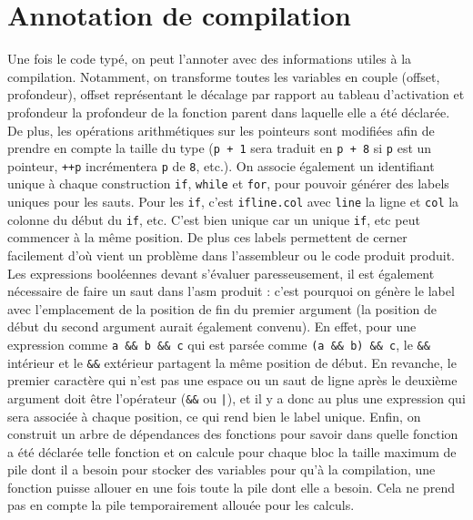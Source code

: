 \documentclass{scrartcl}
\begin{document}
\section*{Annotation de compilation}
Une fois le code typé, on peut l'annoter avec des informations utiles à la compilation.
Notamment, on transforme toutes les variables en couple (offset, profondeur), offset représentant
le décalage par rapport au tableau d'activation et profondeur la profondeur de la fonction parent dans
laquelle elle a été déclarée. De plus, les opérations arithmétiques sur les pointeurs sont modifiées afin
de prendre en compte la taille du type (\verb|p + 1| sera traduit en \verb|p + 8| si \verb|p| est
un pointeur, \verb|++p| incrémentera \verb|p| de \verb|8|, etc.). On associe également un identifiant
unique à chaque construction \verb|if|, \verb|while| et \verb|for|, pour pouvoir générer des labels
uniques pour les sauts. Pour les \verb|if|, c'est \verb|ifline.col| avec \verb|line| la ligne et
\verb|col| la colonne du début du \verb|if|, etc. C'est bien unique car un unique \verb|if|, etc peut
commencer à la même position. De plus ces labels permettent de cerner facilement d'où vient un problème
dans l'assembleur ou le code produit produit. Les expressions booléennes devant s'évaluer paresseusement,
il est également nécessaire de faire un saut dans l'asm produit : c'est pourquoi on génère le label
avec l'emplacement de la position de fin du premier argument (la position de début du second argument
aurait également convenu). En effet, pour une expression comme \verb|a && b && c| qui
est parsée comme \verb|(a && b) && c|, le \verb|&&| intérieur et le \verb|&&| extérieur partagent
la même position de début. En revanche, le premier caractère qui n'est pas une espace
ou un saut de ligne après le deuxième argument doit être l'opérateur (\verb|&&| ou \verb?|?),
et il y a donc au plus une expression qui sera associée à chaque position,
ce qui rend bien le label unique. Enfin,
on construit un arbre de dépendances des fonctions pour savoir dans quelle fonction a été déclarée
telle fonction et on calcule pour chaque bloc la taille maximum de pile dont il a besoin pour stocker
des variables pour qu'à la compilation, une fonction puisse allouer en une fois toute la pile
dont elle a besoin. Cela ne prend pas en compte la pile temporairement allouée pour les calculs.
\end{document}
